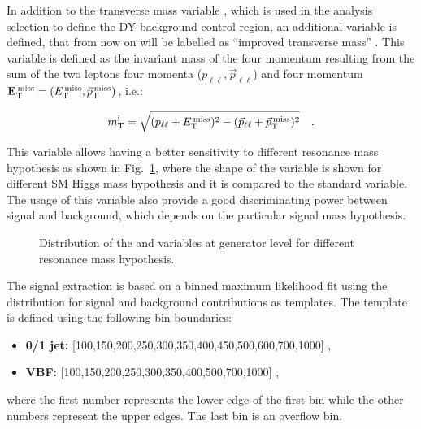 In addition to the transverse mass variable \mt, which is used in the analysis selection to define the DY background control region, an additional variable is defined, that from now on will be labelled as ``improved transverse mass'' \mti. This variable is defined as the invariant mass of the four momentum resulting from the sum of the two leptons four momenta ($p_{\ell\ell},\vec{p}_{\ell\ell}$)
and four momentum $\mathbf{E_\mathrm{T}^\mathrm{\,miss}} = (E_\mathrm{T}^\mathrm{\,miss}, \vec{p}_\mathrm{T}^\mathrm{\,miss})$, i.e.:

\begin{equation} 
m_\mathrm{T}^\mathrm{i} = \sqrt{(p_{\ell\ell}+E_\mathrm{T}^\mathrm{\,miss})^2-(\vec{p}_{\ell\ell}+\vec{p}_\mathrm{T}^\mathrm{\,miss})^2} \quad .
\end{equation}

This variable allows having a better sensitivity to different resonance mass hypothesis as shown in Fig.~\ref{fig:mti}, where the shape of the \mti variable is shown for different SM Higgs mass hypothesis and it is compared to the standard \mt variable. The usage of this variable also provide a good discriminating power between signal and background, which depends on the particular signal mass hypothesis.

\begin{figure}[htbp]
\centering
{}
\caption{
    Distribution of the \mt and \mti variables at generator level for different resonance mass hypothesis.}
    \label{fig:mti}
\end{figure}

The signal extraction is based on a binned maximum likelihood fit using the \mti distribution for signal and background contributions as templates. The \mti template is defined using the following bin boundaries:
\begin{itemize}
\item {\bf 0/1 jet: } [100,150,200,250,300,350,400,450,500,600,700,1000] ,
\item {\bf VBF: } [100,150,200,250,300,350,400,500,700,1000] ,
\end{itemize}
where the first number represents the lower edge of the first bin while the other numbers represent the upper edges. The last bin is an overflow bin.

